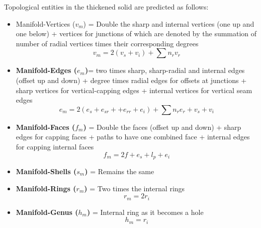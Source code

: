 Topological entities in the thickened solid are predicted as follows:%
\begin{itemize}
[noitemsep,topsep=2pt,parsep=2pt,partopsep=2pt,label=\textbullet]
\item Manifold-Vertices  ($v_m$) = Double the sharp and internal vertices (one up  and  one below) + vertices for junctions of which are denoted by the summation of  number of radial vertices times their corresponding degrees
\begin{equation}
v_m = 2 (v_s + v_i) + \sum n_{r} v_{r} \label{eqn_vm}
\end{equation}
\item \textbf{Manifold-Edges ($e_m$)}= two times sharp, sharp-radial and internal edges (offset up and down) + degree times radial edges for offsets at junctions + sharp vertices for vertical-capping edges + internal vertices for vertical seam edges
\begin{equation}
e_m = 2 (e_s + e_{sr} + + e_{rr} + e_i) + \sum n_r e_r  + v_s + v_i\label{eqn_em}
\end{equation}
\item \textbf{Manifold-Faces ($f_m$)} = Double the faces (offset up and down) + sharp edges for capping faces + paths to have one combined face + internal edges for capping internal faces
\begin{equation}
f_m = 2f + e_s + l_p + e_i \label{eqn_fm}
\end{equation}
\item \textbf{Manifold-Shells ($s_m$)} = Remains the same
\item \textbf{Manifold-Rings ($r_m$)} = Two times the internal rings
\begin{equation}
r_m = 2r_i\label{eqn_rm}
\end{equation}
\item \textbf{Manifold-Genus ($h_m$)} = Internal ring as it becomes a hole
\begin{equation}
h_m = r_i\label{eqn_hm}
\end{equation}

\end{itemize}
